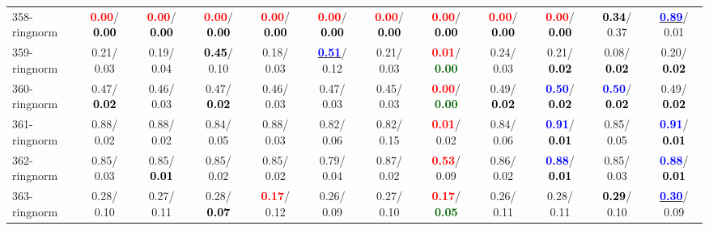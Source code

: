 \begin{table}[h]
\begin{center}
{\begin{tabular}{lc|c|c|c|c|c|c|c|c|c|c}
358-ringnorm & \textcolor{red}{\textbf{  0.00}}/\textcolor{black}{\textbf{  0.00}} & \textcolor{red}{\textbf{  0.00}}/\textcolor{black}{\textbf{  0.00}} & \textcolor{red}{\textbf{  0.00}}/\textcolor{black}{\textbf{  0.00}} & \textcolor{red}{\textbf{  0.00}}/\textcolor{black}{\textbf{  0.00}} & \textcolor{red}{\textbf{  0.00}}/\textcolor{black}{\textbf{  0.00}} & \textcolor{red}{\textbf{  0.00}}/\textcolor{black}{\textbf{  0.00}} & \textcolor{red}{\textbf{  0.00}}/\textcolor{black}{\textbf{  0.00}} & \textcolor{red}{\textbf{  0.00}}/\textcolor{black}{\textbf{  0.00}} & \textcolor{red}{\textbf{  0.00}}/\textcolor{black}{\textbf{  0.00}} & \textcolor{black}{\textbf{  0.34}}/  0.37 & \underline{\textcolor{blue}{\textbf{  0.89}}}/  0.01 \\
359-ringnorm &   0.21/  0.03 &   0.19/  0.04 & \textcolor{black}{\textbf{  0.45}}/  0.10 &   0.18/  0.03 & \underline{\textcolor{blue}{\textbf{  0.51}}}/  0.12 &   0.21/  0.03 & \textcolor{red}{\textbf{  0.01}}/\textcolor{darkgreen}{\textbf{  0.00}} &   0.24/  0.03 &   0.21/\textcolor{black}{\textbf{  0.02}} &   0.08/\textcolor{black}{\textbf{  0.02}} &   0.20/\textcolor{black}{\textbf{  0.02}} \\ \hline
360-ringnorm &   0.47/\textcolor{black}{\textbf{  0.02}} &   0.46/  0.03 &   0.47/\textcolor{black}{\textbf{  0.02}} &   0.46/  0.03 &   0.47/  0.03 &   0.45/  0.03 & \textcolor{red}{\textbf{  0.00}}/\textcolor{darkgreen}{\textbf{  0.00}} &   0.49/\textcolor{black}{\textbf{  0.02}} & \textcolor{blue}{\textbf{  0.50}}/\textcolor{black}{\textbf{  0.02}} & \textcolor{blue}{\textbf{  0.50}}/\textcolor{black}{\textbf{  0.02}} &   0.49/\textcolor{black}{\textbf{  0.02}} \\
361-ringnorm &   0.88/  0.02 &   0.88/  0.02 &   0.84/  0.05 &   0.88/  0.03 &   0.82/  0.06 &   0.82/  0.15 & \textcolor{red}{\textbf{  0.01}}/  0.02 &   0.84/  0.06 & \textcolor{blue}{\textbf{  0.91}}/\textcolor{black}{\textbf{  0.01}} &   0.85/  0.05 & \textcolor{blue}{\textbf{  0.91}}/\textcolor{black}{\textbf{  0.01}} \\
362-ringnorm &   0.85/  0.03 &   0.85/\textcolor{black}{\textbf{  0.01}} &   0.85/  0.02 &   0.85/  0.02 &   0.79/  0.04 &   0.87/  0.02 & \textcolor{red}{\textbf{  0.53}}/  0.09 &   0.86/  0.02 & \textcolor{blue}{\textbf{  0.88}}/\textcolor{black}{\textbf{  0.01}} &   0.85/  0.03 & \textcolor{blue}{\textbf{  0.88}}/\textcolor{black}{\textbf{  0.01}} \\
363-ringnorm &   0.28/  0.10 &   0.27/  0.11 &   0.28/\textcolor{black}{\textbf{  0.07}} & \textcolor{red}{\textbf{  0.17}}/  0.12 &   0.26/  0.09 &   0.27/  0.10 & \textcolor{red}{\textbf{  0.17}}/\textcolor{darkgreen}{\textbf{  0.05}} &   0.26/  0.11 &   0.28/  0.11 & \textcolor{black}{\textbf{  0.29}}/  0.10 & \underline{\textcolor{blue}{\textbf{  0.30}}}/  0.09 \\

\end{tabular}}
\end{center}
\end{table}
